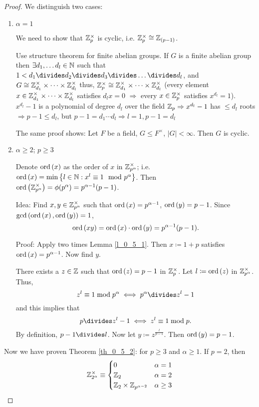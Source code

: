 \documentclass[NumTh.tex]{subfiles}
\begin{document}
\begin{proof}
  We distinguish two cases:
  \begin{enumerate}
    \item $\alpha = 1$
    
    We need to show that $\mathbb{Z}_p^\times$ is cyclic, i.e. $\mathbb{Z}_p^\times \cong \mathbb{Z}_{(p-1)}$.
    
    Use structure theorem for finite abelian groups. If $G$ is a finite abelian group then $\exists d_1,\dots d_l \in \mathbb{N}$ such that
    $1 < d_1\divides d_2\divides d_3\divides \dots\divides d_l$, and $G \cong \mathbb{Z}_{d_1}^\times \times \dots \times \mathbb{Z}_{d_l}^\times$
    thus, $\mathbb{Z}_p^\times \cong \mathbb{Z}_{d_1}^\times \times \dots \times \mathbb{Z}_{d_l}^\times$ 
    (every element $x \in \mathbb{Z}_{d_1}^\times \times \dots \times \mathbb{Z}_{d_l}^\times$ satisfies $d_l x = 0$
    $\Rightarrow$ every $x \in \mathbb{Z}_p^\times$ satisfies $x^{d_l} = 1$).
    $x^{d_l} -1$ is a polynomial of degree $d_l$ over the field $\mathbb{Z}_p \Rightarrow x^{d_l} -1$ has $\leq d_l$ roots $\Rightarrow p-1 \leq d_l$,
    but $p-1 = d_1 \cdots d_l \Rightarrow l = 1, p-1 = d_l$
    \begin{rem}
      The same proof shows: Let $F$ be a field, $G \leq F^\times$, $|G| < \infty$. Then $G$ is cyclic.
    \end{rem}
    \item $\alpha \geq 2$; $p \geq 3$
    
    Denote $\operatorname{ord}\left(x\right)$ as the order of $x$ in $\mathbb{Z}_{p^\alpha}^\times$;
    i.e. $\operatorname{ord}\left(x\right) = \min\left\{l\in \mathbb{N} : x^l\equiv 1 \mod p^\alpha\right\}$.
    Then $\operatorname{ord}\left(\mathbb{Z}_{p^\alpha}^\times \right) = \phi(p^\alpha) = p^{\alpha -1}(p-1)$.
    
    Idea: Find $x,y \in \mathbb{Z}_{p^\alpha}^\times$ such that $\operatorname{ord}\left(x\right) = p^{\alpha-1}$, $\operatorname{ord}\left(y\right) = p-1$.
    Since $\gcd\left(\operatorname{ord}\left(x\right),\operatorname{ord}\left(y\right)\right) = 1$,
    \[ \operatorname{ord}\left(xy\right) = \operatorname{ord}\left(x\right) \cdot \operatorname{ord}\left(y\right) = p^{\alpha-1}(p-1) \text{.} \]
    
    
    Proof: Apply two times Lemma \ref{l_0_5_1}. Then $x \coloneqq 1+p$ satisfies $\operatorname{ord}\left(x\right) = p^{\alpha -1}$. 
    Now find $y$.
    
    There exists a $z \in \mathbb{Z}$ such that $\operatorname{ord}\left(z\right) = p-1$ in $\mathbb{Z}_p^\times$.
    Let $l \coloneqq \operatorname{ord}\left(z\right)$ in $\mathbb{Z}_{p^\alpha}^\times$.
    Thus,
    \[ z^l \equiv 1 \bmod p^\alpha \iff p^\alpha \divides z^l-1 \]
    and this implies that
    \[ p \divides z^l - 1 \iff z^l \equiv 1 \bmod p \text{.} \]
    By definition, $p-1 \divides  l$.
    Now let $y \coloneq z^{\frac{l}{p-1}}$.
    Then $\operatorname{ord}\left(y\right) = p-1$.
  \end{enumerate}
  
  Now we have proven Theorem \ref{th_0_5_2}: for $p \geq 3$ and $\alpha \geq 1$.
  If $p = 2$, then
  \[ \mathbb{Z}_{2^\alpha}^\times \equiv
  \begin{cases}
    0 & \alpha = 1 \\
    \mathbb{Z}_2 & \alpha = 2 \\
    \mathbb{Z}_2 \times \mathbb{Z}_{p^{\alpha - 2}} & \alpha \geq 3
  \end{cases} \]
\end{proof}
\end{document}
